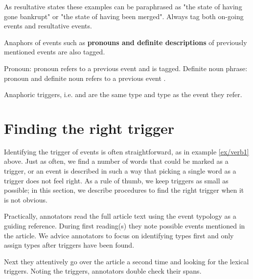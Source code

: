 \documentclass[a4paper]{report}
\begin{document}
As resultative states these examples can be paraphrased as "the state of having gone bankrupt" or "the state of having been merged".
Always tag both on-going events and resultative events.

Anaphors of events such as \textbf{pronouns and definite descriptions} of previously mentioned events are also tagged.

\begin{exe}
    \ex\label{ex/pronoun1} Pronoun: 
        \expl pronoun  refers to a previous  event and is tagged.
    \ex\label{ex/pronoun1} Definite noun phrase: 
        \expl pronoun  and definite noun  refers to a previous event .
\end{exe}

Anaphoric triggers, i.e.  and  are the same type and type as the event they refer.


\section{Finding the right trigger}

Identifying the trigger of events is often straightforward, as in example \ref{ex/verb1} above.
Just as often, we find a number of words that could be marked as a trigger, or an event is described in such a way that picking a single word as a trigger does not feel right.
As a rule of thumb, we keep triggers as small as possible; in this section, we describe procedures to find the right trigger when it is not obvious.

Practically, annotators read the full article text using the event typology as a guiding reference.
During first reading(s) they note possible events mentioned in the article.
We advice annotators to focus on identifying types first and only assign types after triggers have been found.

Next they attentively go over the article a second time and looking for the lexical triggers.
Noting the triggers, annotators double check their spans.

\end{document}
